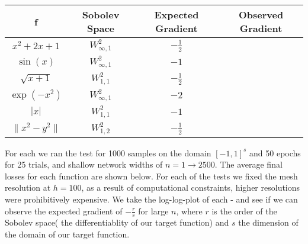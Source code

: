 \documentclass[11pt,a4paper]{article}
\theoremstyle{plain}
\theoremstyle{definition}
\theoremstyle{remark}
\begin{document}
% 
\begin{table}[h]
    \centering
    \begin{tabular}{|c|c|c|c|}
    \hline
    \textbf{f} & \textbf{Sobolev Space} & \textbf{Expected Gradient} & \textbf{Observed Gradient} \\
    \hline
    \(x^2 + 2x + 1\) & \(W^{2}_{\infty,1}\) & \(-\frac{1}{2}\) &  \\
    \(\sin(x)\) & \(W^{2}_{\infty,1}\) & \(-1\) &  \\
    \(\sqrt{x+1}\) & \(W^{2}_{1,1}\) & \(-\frac{1}{2}\) &  \\
    \(\exp(-x^2)\) & \(W^{2}_{\infty,1}\) & \(-2\) &  \\
    \(|x|\) & \(W^{2}_{1,1}\) & \(-1\) &  \\
    \(\|x^2 - y^2\|\) & \(W^{2}_{1,2}\) & \(-\frac{1}{2}\) &  \\
    \hline
    \end{tabular}
    \label{tab:label}
\end{table}
% 


For each we ran the test for 1000 samples on the domain \([-1,1]^s\)  and 50 epochs for 25 trials, and shallow network widths of \(n = 1 \to 2500\). The average final losses for each function are shown below. For each of the tests we fixed the mesh resolution at \(h = 100\), as a result of computational constraints, higher resolutions were prohibitively expensive.
We take the log-log-plot of each - and see if we can observe the expected gradient of \(-\frac{r}{s}\) for large \(n\), where \(r\) is the order of the Sobolev space( the differentiablity of our target function) and \(s\) the dimension of the domain of our target function.
\end{document}
